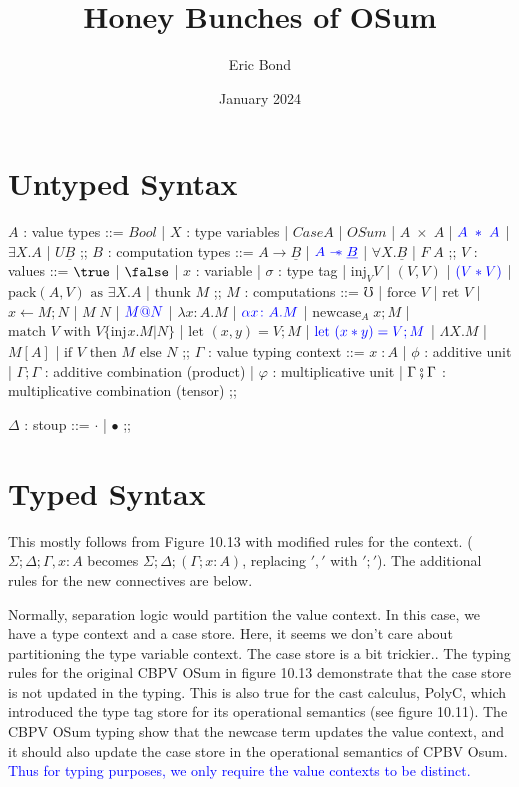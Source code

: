 \documentclass{article}
\title{Honey Bunches of OSum}
\author{Eric Bond}
\date{January 2024}
\makeatletter
\newcommand{\blue}[1]{\textcolor{blue}{#1}}
\newcommand\sep{\mathrel{-\mkern-6mu*}}
\newcommand{\pack}[3]{\text{pack}(#1,#2)\text{ as }#3}
\newcommand{\thunk}[1]{\text{thunk }#1}
\newcommand{\injj}[2]{\text{inj}_{#1}#2}
\newcommand{\err}{\mho}
\newcommand{\force}[1]{\text{force }#1}
\newcommand{\ret}[1]{\text{ret }#1}
\newcommand{\bind}[3]{#1 \leftarrow #2 ; #3}
\newcommand{\newcase}[3]{\text{newcase}_{#1} \; #2 ; #3}
\newcommand{\match}[5]{\text{match }#1 \text{ with }#2 \{#3 . #4 | #5\}}
\newcommand{\lett}[4]{\text{let }(#1,#2) = #3 ; #4}
\newcommand{\lets}[4]{\text{let }(#1*#2) = #3 ; #4}
\newcommand{\ite}[3]{\text{if }#1 \text{ then }#2 \text{ else }#3}
\newcommand{\at}{\text{@}}
\makeatother
\begin{document}
\maketitle
\newpage
\section{Untyped Syntax}
\begin{bnfgrammar}
$A$ : value types ::= $Bool$
| $X$ : type variables
| $Case A$ 
| $OSum$
| $A\; \times \; A$  
| $\blue{A\; * \; A}$
| $\exists X . A$
| $U\underline{B}$
;;
$B$ : computation types ::= $A \rightarrow \underline{B}$ 
| $\blue{A \sep \underline{B}}$
| $\forall X. \underline{B}$
| $F\;A$
;;
$V$ : values ::= $\true$
| $\false$
| $x$ : variable
| $\sigma$ : type tag
| $\injj{V}{V}$
| $(V,V)$
| $\blue{(V*V)}$
| $\pack{A}{V}{\exists X .A}$
| $\thunk{M}$
;;
$M$ : computations ::= $\err$
| $\force{V}$
| $\ret{V}$
| $\bind{x}{M}{N}$
| $M \; N$
| $\blue{M \at N}$
| $\lambda x \colon A . M$
| $\blue{\alpha x \colon A . M}$
| $\newcase{A}{x}{M}$
| $\match{V}{V}{\injj{}{x}}{M}{N}$
| $\lett{x}{y}{V}{M}$
| $\blue{\lets{x}{y}{V}{M}}$
| $\Lambda X . M$
| $M[A]$
| $\ite{V}{M}{N}$
;;
$\Gamma$ : value typing context ::= $x\; \colon A$ 
| $\phi$ : additive unit
| $\Gamma ; \Gamma$ : additive combination (product)
| $\varphi$ : multiplicative unit
| $\Gamma \fatsemi \Gamma$ : multiplicative combination (tensor)
;;

$\Delta$ : stoup ::= $\cdot$ 
| $\bullet$
;;
\end{bnfgrammar}

\section{Typed Syntax}
This mostly follows from Figure 10.13 with modified rules for the context. ($\Sigma;\Delta;\Gamma , x : A$ becomes $\Sigma;\Delta;(\Gamma ; x : A)$, replacing $','$ with $';'$). The additional rules for the new connectives are below.

Normally, separation logic would partition the value context. In this case, we have a type context and a case store. Here, it seems we don't care about partitioning the type variable context. The case store is a bit trickier.. The typing rules for the original CBPV OSum in figure 10.13 demonstrate that the case store is not updated in the typing. This is also true for the cast calculus, PolyC, which introduced the type tag store for its operational semantics (see figure 10.11). The CBPV OSum typing show that the newcase term updates the value context, and it should also update the case store in the operational semantics of CPBV Osum. \blue{Thus for typing purposes, we only require the value contexts to be distinct.}
\begin{prooftree}
\end{prooftree}
\end{document}
